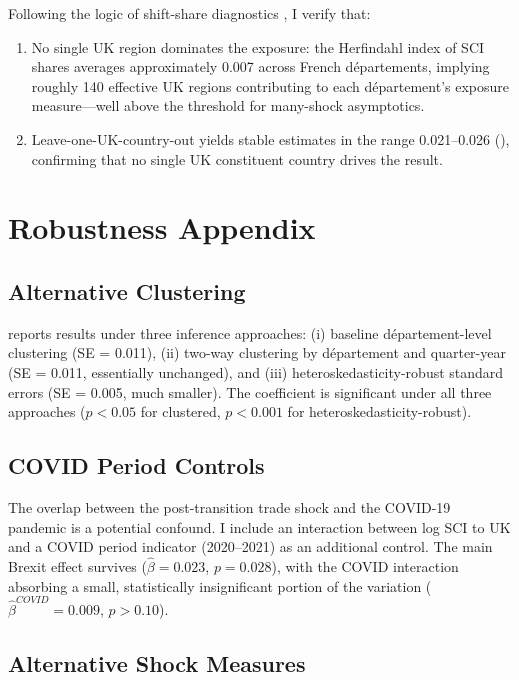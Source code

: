 \documentclass[12pt]{article}
\begin{document}
Following the logic of shift-share diagnostics \citep{borusyak2022quasi, goldsmith2020bartik}, I verify that:
\begin{enumerate}
\item No single UK region dominates the exposure: the Herfindahl index of SCI shares averages approximately 0.007 across French d\'epartements, implying roughly 140 effective UK regions contributing to each d\'epartement's exposure measure---well above the threshold for many-shock asymptotics.
\item Leave-one-UK-country-out yields stable estimates in the range 0.021--0.026 (), confirming that no single UK constituent country drives the result.
\end{enumerate}

\section{Robustness Appendix}

\subsection{Alternative Clustering}

 reports results under three inference approaches: (i) baseline d\'epartement-level clustering (SE = 0.011), (ii) two-way clustering by d\'epartement and quarter-year (SE = 0.011, essentially unchanged), and (iii) heteroskedasticity-robust standard errors (SE = 0.005, much smaller). The coefficient is significant under all three approaches ($p < 0.05$ for clustered, $p < 0.001$ for heteroskedasticity-robust).

\subsection{COVID Period Controls}

The overlap between the post-transition trade shock and the COVID-19 pandemic is a potential confound. I include an interaction between log SCI to UK and a COVID period indicator (2020--2021) as an additional control. The main Brexit effect survives ($\hat{\beta} = 0.023$, $p = 0.028$), with the COVID interaction absorbing a small, statistically insignificant portion of the variation ($\hat{\beta}^{COVID} = 0.009$, $p > 0.10$).

\subsection{Alternative Shock Measures}
\end{document}
